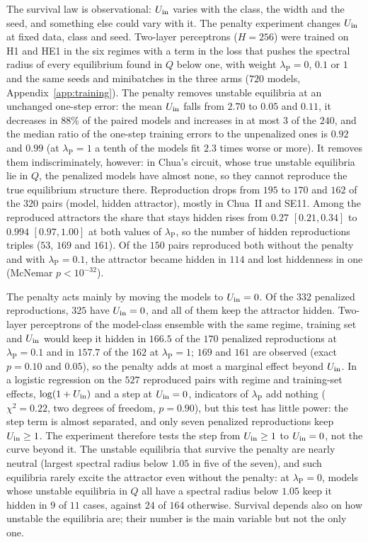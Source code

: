 The survival law is observational: $U_{\mathrm{in}}$ varies with the class, the width and the seed, and something else could vary with
it. The penalty experiment changes $U_{\mathrm{in}}$ at fixed data, class and seed. Two-layer perceptrons ($H=256$) were trained on H1
and HE1 in the six regimes with a term in the loss that pushes the spectral radius of every equilibrium found in $Q$ below
one, with weight $\lambda_{\mathrm{P}}=0$, $0.1$ or $1$ and the same seeds and minibatches in the three arms ($720$ models,
Appendix~\ref{app:training}). The penalty removes unstable equilibria at an unchanged one-step error: the mean $U_{\mathrm{in}}$ falls
from $2.70$ to $0.05$ and $0.11$, it decreases in $88\%$ of the paired models and increases in at most $3$ of the $240$, and
the median ratio of the one-step training errors to the unpenalized ones is $0.92$ and $0.99$ (at $\lambda_{\mathrm{P}}=1$ a tenth of the
models fit $2.3$ times worse or more). It removes them indiscriminately, however: in Chua's circuit, whose true unstable
equilibria lie in $Q$, the penalized models have almost none, so they cannot reproduce the true equilibrium structure there. Reproduction drops
from $195$ to $170$ and $162$ of the $320$ pairs (model, hidden attractor), mostly in Chua~II and SE11. Among the reproduced
attractors the share that stays hidden rises from $0.27$ $[0.21,0.34]$ to $0.994$ $[0.97,1.00]$ at both values of $\lambda_{\mathrm{P}}$,
so the number of hidden reproductions triples ($53$, $169$ and $161$). Of the $150$ pairs reproduced both without the
penalty and with $\lambda_{\mathrm{P}}=0.1$, the attractor became hidden in $114$ and lost hiddenness in one (McNemar $p<10^{-32}$).

The penalty acts mainly by moving the models to $U_{\mathrm{in}}=0$. Of the $332$ penalized reproductions, $325$ have $U_{\mathrm{in}}=0$, and all
of them keep the attractor hidden. Two-layer perceptrons of the model-class ensemble with the same regime, training set
and $U_{\mathrm{in}}$ would keep it hidden in $166.5$ of the $170$ penalized reproductions at $\lambda_{\mathrm{P}}=0.1$ and in $157.7$ of
the $162$ at $\lambda_{\mathrm{P}}=1$; $169$ and $161$ are observed (exact $p=0.10$ and $0.05$), so the penalty adds at most
a marginal effect beyond $U_{\mathrm{in}}$. In a logistic regression on the $527$ reproduced pairs with regime and training-set effects, $\log(1+U_{\mathrm{in}})$ and
a step at $U_{\mathrm{in}}=0$, indicators of $\lambda_{\mathrm{P}}$ add nothing ($\chi^2=0.22$, two degrees of freedom, $p=0.90$), but this test has
little power: the step term is almost separated, and only seven penalized reproductions keep $U_{\mathrm{in}}\ge1$. The experiment
therefore tests the step from $U_{\mathrm{in}}\ge1$ to $U_{\mathrm{in}}=0$, not the curve beyond it. The unstable equilibria that survive the
penalty are nearly neutral (largest spectral radius below $1.05$ in five of the seven), and such equilibria rarely excite
the attractor even without the penalty: at $\lambda_{\mathrm{P}}=0$, models whose unstable equilibria in $Q$ all have a spectral radius below $1.05$ keep it
hidden in $9$ of $11$ cases, against $24$ of $164$ otherwise. Survival depends also on how unstable the equilibria are;
their number is the main variable but not the only one.

